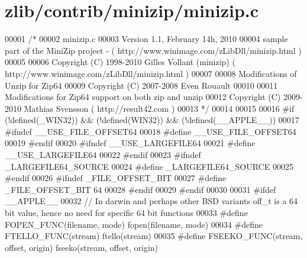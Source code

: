 \hypertarget{zlib_2contrib_2minizip_2minizip_8c_source}{}\section{zlib/contrib/minizip/minizip.c}
\label{zlib_2contrib_2minizip_2minizip_8c_source}

\begin{DoxyCode}
00001 \textcolor{comment}{/*}
00002 \textcolor{comment}{   minizip.c}
00003 \textcolor{comment}{   Version 1.1, February 14h, 2010}
00004 \textcolor{comment}{   sample part of the MiniZip project - ( http://www.winimage.com/zLibDll/minizip.html )}
00005 \textcolor{comment}{}
00006 \textcolor{comment}{         Copyright (C) 1998-2010 Gilles Vollant (minizip) ( http://www.winimage.com/zLibDll/minizip.html )}
00007 \textcolor{comment}{}
00008 \textcolor{comment}{         Modifications of Unzip for Zip64}
00009 \textcolor{comment}{         Copyright (C) 2007-2008 Even Rouault}
00010 \textcolor{comment}{}
00011 \textcolor{comment}{         Modifications for Zip64 support on both zip and unzip}
00012 \textcolor{comment}{         Copyright (C) 2009-2010 Mathias Svensson ( http://result42.com )}
00013 \textcolor{comment}{*/}
00014 
00015 
00016 \textcolor{preprocessor}{#if (!defined(\_WIN32)) && (!defined(WIN32)) && (!defined(\_\_APPLE\_\_))}
00017 \textcolor{preprocessor}{        #ifndef \_\_USE\_FILE\_OFFSET64}
00018 \textcolor{preprocessor}{                #define \_\_USE\_FILE\_OFFSET64}
00019 \textcolor{preprocessor}{        #endif}
00020 \textcolor{preprocessor}{        #ifndef \_\_USE\_LARGEFILE64}
00021 \textcolor{preprocessor}{                #define \_\_USE\_LARGEFILE64}
00022 \textcolor{preprocessor}{        #endif}
00023 \textcolor{preprocessor}{        #ifndef \_LARGEFILE64\_SOURCE}
00024 \textcolor{preprocessor}{                #define \_LARGEFILE64\_SOURCE}
00025 \textcolor{preprocessor}{        #endif}
00026 \textcolor{preprocessor}{        #ifndef \_FILE\_OFFSET\_BIT}
00027 \textcolor{preprocessor}{                #define \_FILE\_OFFSET\_BIT 64}
00028 \textcolor{preprocessor}{        #endif}
00029 \textcolor{preprocessor}{#endif}
00030 
00031 \textcolor{preprocessor}{#ifdef \_\_APPLE\_\_}
00032 \textcolor{comment}{// In darwin and perhaps other BSD variants off\_t is a 64 bit value, hence no need for specific 64 bit
       functions}
00033 \textcolor{preprocessor}{#define FOPEN\_FUNC(filename, mode) fopen(filename, mode)}
00034 \textcolor{preprocessor}{#define FTELLO\_FUNC(stream) ftello(stream)}
00035 \textcolor{preprocessor}{#define FSEEKO\_FUNC(stream, offset, origin) fseeko(stream, offset, origin)}

\end{DoxyCode}

